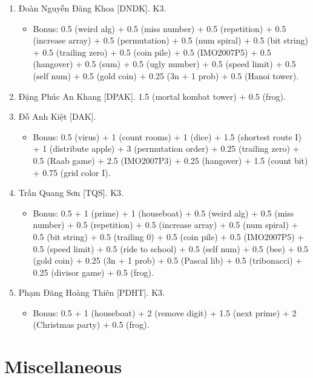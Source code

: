 \documentclass{article}
\begin{document}
\begin{enumerate}
    \item {\sc Đoàn Nguyễn Đăng Khoa [DNDK].} K3.
    \begin{itemize}
        \item Bonus: 0.5 (weird alg) + 0.5 (miss number) + 0.5 (repetition) + 0.5 (increase array) + 0.5 (permutation) + 0.5 (num spiral) + 0.5 (bit string) + 0.5 (trailing zero) + 0.5 (coin pile) + 0.5 (IMO2007P5) + 0.5 (hangover) + 0.5 (sum) + 0.5 (ugly number) + 0.5 (speed limit) + 0.5 (self num) + 0.5 (gold coin) + 0.25 (3n + 1 prob) + 0.5 (Hanoi tower).
    \end{itemize}
    \item {\sc Đặng Phúc An Khang [DPAK].} 1.5 (mortal kombat tower) + 0.5 (frog).
	\item {\sc Đỗ Anh Kiệt [DAK].}
	\begin{itemize}
		\item Bonus: 0.5 (virus) + 1 (count rooms) + 1 (dice) + 1.5 (shortest route I)  + 1 (distribute apple) + 3 (permutation order) + 0.25 (trailing zero) + 0.5 (Raab game) + 2.5 (IMO2007P3) + 0.25 (hangover) + 1.5 (count bit) + 0.75 (grid color I).
	\end{itemize}
	\item {\sc Trần Quang Sơn [TQS].} K3.
	\begin{itemize}
		\item Bonus: 0.5 + 1 (prime) + 1 (houseboat) + 0.5 (weird alg) + 0.5 (miss number) + 0.5 (repetition) + 0.5 (increase array) + 0.5 (num spiral) + 0.5 (bit string) + 0.5 (trailing 0) + 0.5 (coin pile) + 0.5 (IMO2007P5) + 0.5 (speed limit) + 0.5 (ride to school) + 0.5 (self num) + 0.5 (bee) + 0.5 (gold coin) + 0.25 (3n + 1 prob) + 0.5 (Pascal lib) + 0.5 (tribonacci) + 0.25 (divisor game) + 0.5 (frog).
	\end{itemize}
	\item {\sc Phạm Đăng Hoàng Thiên [PDHT].} K3.
		\begin{itemize}
		\item Bonus: 0.5 + 1 (houseboat) + 2 (remove digit) + 1.5 (next prime) + 2 (Christmas party) + 0.5 (frog).
	\end{itemize}
\end{enumerate}


\section{Miscellaneous}


\printbibliography[heading=bibintoc]
\end{document}
